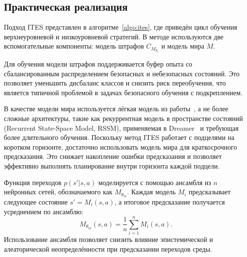 \subsection{Практическая реализация}
\label{subsec:ites_practical}

Подход ITES представлен в алгоритме~\ref{algo:ites}, где приведён цикл обучения верхнеуровневой и низкоуровневой стратегий. В методе используются две вспомогательные компоненты: модель штрафов $C_{M_{\theta_c}}$ и модель мира $M$.

Для обучения модели штрафов поддерживается буфер опыта со сбалансированным распределением безопасных и небезопасных состояний. Это позволяет уменьшить дисбаланс классов и снизить риск переобучения, что является типичной проблемой в задачах безопасного обучения с подкреплением.

В качестве модели мира используется лёгкая модель из работы~\cite{mbpo}, а не более сложные архитектуры, такие как рекуррентная модель в пространстве состояний (Recurrent State-Space Model, RSSM), применяемая в Dreamer~\cite{hafner2023dreamerv3} и требующая более длительного обучения. Поскольку метод ITES работает с подцелями на коротком горизонте, достаточно использовать модель мира для краткосрочного предсказания. Это снижает накопление ошибки предсказания и позволяет эффективно выполнять планирование внутри горизонта каждой подцели.

Функция переходов $p(s'|s,a)$ моделируется с помощью ансамбля из $n$ нейронных сетей, обозначаемого как $M_{\theta_m}$. Каждая модель $M_i$ предсказывает следующее состояние $s' = M_i(s,a)$, а итоговое предсказание получается усреднением по ансамблю:
\begin{equation}
    \label{eq:ites_world_model_ensemble}
    M_{\theta_m}(s,a)
    =
    \frac{1}{n}
    \sum_{i=1}^{n}
    M_i(s,a).
\end{equation}
Использование ансамбля позволяет снизить влияние эпистемической и алеаторической неопределённости при предсказании переходов среды.

